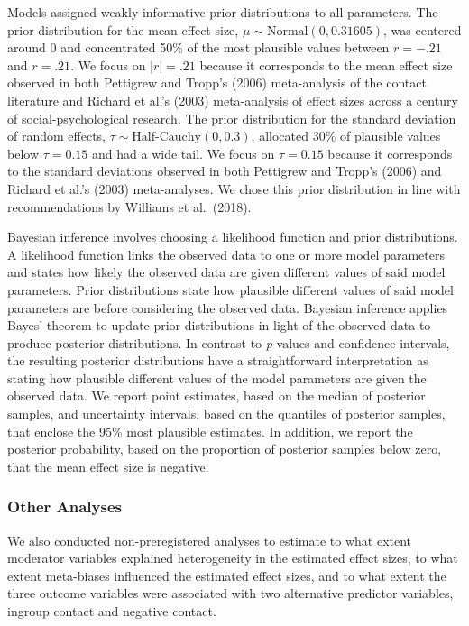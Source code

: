 \documentclass[12pt, letterpaper]{article}
\begin{document}
Models assigned weakly informative prior distributions to all
parameters. The prior distribution for the mean effect size,
\(\mu \sim \text{Normal}(0, 0.31605)\), was centered around 0 and
concentrated 50\% of the most plausible values between \(r = -.21\) and
\(r = .21\). We focus on \(|r| = .21\) because it corresponds to the
mean effect size observed in both Pettigrew and Tropp's (2006)
meta-analysis of the contact literature and Richard et al.'s (2003)
meta-analysis of effect sizes across a century of social-psychological
research. The prior distribution for the standard deviation of random
effects, \(\tau \sim \text{Half-Cauchy}(0, 0.3)\), allocated 30\% of
plausible values below \(\tau = 0.15\) and had a wide tail. We focus on
\(\tau = 0.15\) because it corresponds to the standard deviations
observed in both Pettigrew and Tropp's (2006) and Richard et al.'s
(2003) meta-analyses. We chose this prior distribution in line with
recommendations by Williams et al.~(2018).

Bayesian inference involves choosing a likelihood function and prior
distributions. A likelihood function links the observed data to one or
more model parameters and states how likely the observed data are given
different values of said model parameters. Prior distributions state how
plausible different values of said model parameters are before
considering the observed data. Bayesian inference applies Bayes' theorem
to update prior distributions in light of the observed data to produce
posterior distributions. In contrast to \emph{p}-values and confidence
intervals, the resulting posterior distributions have a straightforward
interpretation as stating how plausible different values of the model
parameters are given the observed data. We report point estimates, based
on the median of posterior samples, and uncertainty intervals, based on
the quantiles of posterior samples, that enclose the 95\% most plausible
estimates. In addition, we report the posterior probability, based on
the proportion of posterior samples below zero, that the mean effect
size is negative.

\hypertarget{other-analyses}{%
\subsubsection{Other Analyses}\label{other-analyses}}

We also conducted non-preregistered analyses to estimate to what extent
moderator variables explained heterogeneity in the estimated effect
sizes, to what extent meta-biases influenced the estimated effect sizes,
and to what extent the three outcome variables were associated with two
alternative predictor variables, ingroup contact and negative contact.
\end{document}
